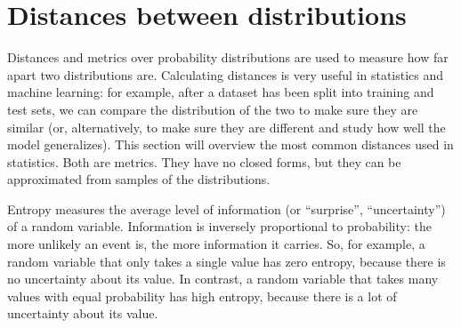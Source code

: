 \section*{Distances between distributions}

Distances and metrics over probability distributions are used to measure how far apart two distributions are. Calculating distances is very useful in statistics and machine learning: for example, after a dataset has been split into training and test sets, we can compare the distribution of the two to make sure they are similar (or, alternatively, to make sure they are different and study how well the model generalizes). This section will overview the most common distances used in statistics.
Both are metrics. They have no closed forms, but they can be approximated from samples of the distributions.

Entropy measures the average level of information (or ``surprise'', ``uncertainty'') of a random variable. Information is inversely proportional to probability: the more unlikely an event is, the more information it carries. So, for example, a random variable that only takes a single value has zero entropy, because there is no uncertainty about its value. In contrast, a random variable that takes many values with equal probability has high entropy, because there is a lot of uncertainty about its value.

